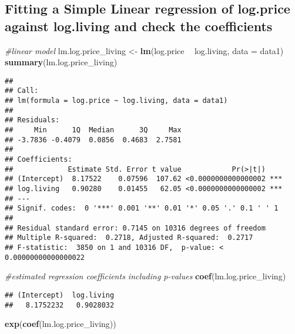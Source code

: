 \documentclass[
]{article}
\newenvironment{Shaded}{\begin{snugshade}}{\end{snugshade}}
\newcommand{\CommentTok}[1]{\textcolor[rgb]{0.56,0.35,0.01}{\textit{#1}}}
\newcommand{\DataTypeTok}[1]{\textcolor[rgb]{0.13,0.29,0.53}{#1}}
\newcommand{\KeywordTok}[1]{\textcolor[rgb]{0.13,0.29,0.53}{\textbf{#1}}}
\newcommand{\NormalTok}[1]{#1}
\newcommand{\OperatorTok}[1]{\textcolor[rgb]{0.81,0.36,0.00}{\textbf{#1}}}
\newcommand{\StringTok}[1]{\textcolor[rgb]{0.31,0.60,0.02}{#1}}
\begin{document}
\hypertarget{fitting-a-simple-linear-regression-of-log.price-against-log.living-and-check-the-coefficients}{%
\subsection{Fitting a Simple Linear regression of log.price against
log.living and check the
coefficients}\label{fitting-a-simple-linear-regression-of-log.price-against-log.living-and-check-the-coefficients}}

\begin{Shaded}
\begin{Highlighting}[]
\CommentTok{#linear model}
\NormalTok{lm.log.price_living <-}\StringTok{ }\KeywordTok{lm}\NormalTok{(log.price }\OperatorTok{~}\StringTok{ }\NormalTok{log.living, }\DataTypeTok{data =}\NormalTok{ data1)}
\KeywordTok{summary}\NormalTok{(lm.log.price_living)}
\end{Highlighting}
\end{Shaded}

\begin{verbatim}
## 
## Call:
## lm(formula = log.price ~ log.living, data = data1)
## 
## Residuals:
##     Min      1Q  Median      3Q     Max 
## -3.7836 -0.4079  0.0856  0.4683  2.7581 
## 
## Coefficients:
##             Estimate Std. Error t value            Pr(>|t|)    
## (Intercept)  8.17522    0.07596  107.62 <0.0000000000000002 ***
## log.living   0.90280    0.01455   62.05 <0.0000000000000002 ***
## ---
## Signif. codes:  0 '***' 0.001 '**' 0.01 '*' 0.05 '.' 0.1 ' ' 1
## 
## Residual standard error: 0.7145 on 10316 degrees of freedom
## Multiple R-squared:  0.2718, Adjusted R-squared:  0.2717 
## F-statistic:  3850 on 1 and 10316 DF,  p-value: < 0.00000000000000022
\end{verbatim}

\begin{Shaded}
\begin{Highlighting}[]
\CommentTok{#estimated regression coefficients including p-values}
\KeywordTok{coef}\NormalTok{(lm.log.price_living)}
\end{Highlighting}
\end{Shaded}

\begin{verbatim}
## (Intercept)  log.living 
##   8.1752232   0.9028032
\end{verbatim}

\begin{Shaded}
\begin{Highlighting}[]
\KeywordTok{exp}\NormalTok{(}\KeywordTok{coef}\NormalTok{(lm.log.price_living))}
\end{Highlighting}
\end{Shaded}
\end{document}
